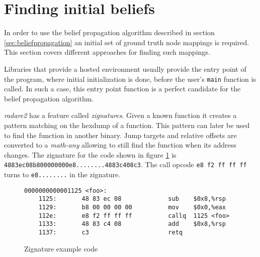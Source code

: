 \documentclass[
    12pt,                               %
    DIV=14,                     %
    parskip=half+,              %
    bigheadings,                %
    cleardoubleempty,   %
    halfparskip,                %
    ]{scrreprt} %
\begin{document}
\section{Finding initial beliefs} \label{sec:findtruth}
In order to use the belief propagation algorithm described in section \ref{sec:beliefpropagation} an initial set of ground truth node mappings is required. This section covers different approaches for finding such mappings.

Libraries that provide a hosted environment usually provide the entry point of the program, where initial initialization is done, before the user's \verb'main' function is called. In such a case, this entry point function is a perfect candidate for the belief propagation algorithm.

\textit{radare2} has a feature called \textit{zignatures}\cite{zignatures}. Given a known function it creates a pattern matching on the hexdump of a function. This pattern can later be used to find the function in another binary. Jump targets and relative offsets are converted to a \textit{math-any} allowing to still find the function when its address changes. The zignature for the code shown in figure \ref{fig:zignatures} is \verb'4883ec08b800000000e8........4883c408c3'. The call opcode \verb'e8 f2 ff ff ff' turns to \verb'e8........' in the zignature.

\begin{figure}[H]
	\begin{lstlisting}
0000000000001125 <foo>:
    1125:       48 83 ec 08             sub    $0x8,%rsp
    1129:       b8 00 00 00 00          mov    $0x0,%eax
    112e:       e8 f2 ff ff ff          callq  1125 <foo>
    1133:       48 83 c4 08             add    $0x8,%rsp
    1137:       c3                      retq
	\end{lstlisting}
	\caption{Zignature example code}
	\label{fig:zignatures}
\end{figure}

\end{document}
